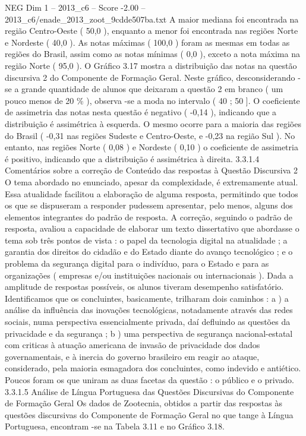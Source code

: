 \begin{textsample}{NEG Dim 1 – 2013\_c6 – Score -2.00 – 2013\_c6/enade\_2013\_zoot\_9cdde507ba.txt}
A maior mediana foi encontrada na região Centro-Oeste ( 50,0 ), enquanto a menor foi encontrada nas regiões Norte e Nordeste ( 40,0 ).
As notas máximas ( 100,0 ) foram as mesmas em todas as regiões do Brasil, assim como as notas mínimas ( 0,0 ), exceto a nota máxima na região Norte ( 95,0 ).
O Gráfico 3.17 mostra a distribuição das notas na questão discursiva 2 do Componente de Formação Geral.
Neste gráfico, desconsiderando -se a grande quantidade de alunos que deixaram a questão 2 em branco ( um pouco menos de 20 \% ), observa -se a moda no intervalo ( 40 ; 50 ].
O coeficiente de assimetria das notas nesta questão é negativo ( -0,14 ), indicando que a distribuição é assimétrica à esquerda.
O mesmo ocorre para a maioria das regiões do Brasil ( -0,31 nas regiões Sudeste e Centro-Oeste, e -0,23 na região Sul ).
No entanto, nas regiões Norte ( 0,08 ) e Nordeste ( 0,10 ) o coeficiente de assimetria é positivo, indicando que a distribuição é assimétrica à direita. 3.3.1.4 Comentários sobre a correção de Conteúdo das respostas à Questão Discursiva 2 O tema abordado no enunciado, apesar da complexidade, é extremamente atual.
Essa atualidade facilitou a elaboração de alguma resposta, permitindo que todos os que se dispuseram a responder pudessem apresentar, pelo menos, alguns dos elementos integrantes do padrão de resposta.
A correção, seguindo o padrão de resposta, avaliou a capacidade de elaborar um texto dissertativo que abordasse o tema sob três pontos de vista : o papel da tecnologia digital na atualidade ; a garantia dos direitos do cidadão e do Estado diante do avanço tecnológico ; e o problema da segurança digital para o indivíduo, para o Estado e para as organizações ( empresas e/ou instituições nacionais ou internacionais ).
Dada a amplitude de respostas possíveis, os alunos tiveram desempenho satisfatório.
Identificamos que os concluintes, basicamente, trilharam dois caminhos : a ) a análise da influência das inovações tecnológicas, notadamente através das redes sociais, numa perspectiva essencialmente privada, daí defluindo as questões da privacidade e da segurança ; b ) uma perspectiva de segurança nacional-estatal com criticas à atuação americana de invasão de privacidade dos dados governamentais, e à inercia do governo brasileiro em reagir ao ataque, considerado, pela maioria esmagadora dos concluintes, como indevido e antiético.
Poucos foram os que uniram as duas facetas da questão : o público e o privado. 3.3.1.5 Análise de Língua Portuguesa das Questões Discursivas do Componente de Formação Geral Os dados de Zootecnia, obtidos a partir das respostas às questões discursivas do Componente de Formação Geral no que tange à Língua Portuguesa, encontram -se na Tabela 3.11 e no Gráfico 3.18.

\end{textsample}
